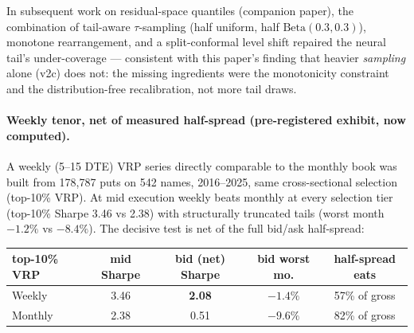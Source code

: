 
In subsequent work on residual-space quantiles (companion paper), the
combination of tail-aware $\tau$-sampling (half uniform, half
$\mathrm{Beta}(0.3,0.3)$), monotone rearrangement, and a split-conformal
level shift repaired the neural tail's under-coverage --- consistent
with this paper's finding that heavier \emph{sampling} alone (v2c) does
not: the missing ingredients were the monotonicity constraint and the
distribution-free recalibration, not more tail draws.


\paragraph{Weekly tenor, net of measured half-spread (pre-registered
exhibit, now computed).} A weekly (5--15 DTE) VRP series directly
comparable to the monthly book was built from 178{,}787 puts on 542
names, 2016--2025, same cross-sectional selection (top-10\% VRP). At mid
execution weekly beats monthly at every selection tier (top-10\% Sharpe
3.46 vs 2.38) with structurally truncated tails (worst month $-1.2\%$ vs
$-8.4\%$). The decisive test is net of the full bid/ask half-spread:

\begin{center}
\begin{tabular}{lcccc}
\toprule
top-10\% VRP & mid Sharpe & bid (net) Sharpe & bid worst mo. &
half-spread eats \\
\midrule
Weekly  & 3.46 & \textbf{2.08} & $-1.4\%$ & 57\% of gross \\
Monthly & 2.38 & 0.51 & $-9.6\%$ & 82\% of gross \\
\bottomrule
\end{tabular}
\end{center}

